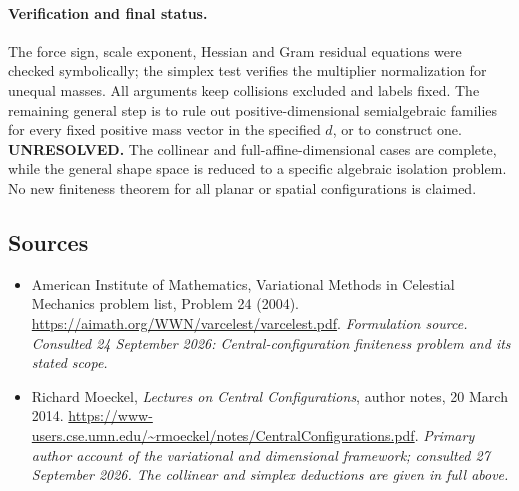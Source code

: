 \documentclass[11pt]{article}
\begin{document}
\paragraph{Verification and final status.}
The force sign, scale exponent, Hessian and Gram residual equations
were checked symbolically; the simplex test verifies the multiplier
normalization for unequal masses. All arguments keep collisions
excluded and labels fixed. The remaining general step is to rule
out positive-dimensional semialgebraic families for every fixed
positive mass vector in the specified $d$, or to construct one.
\textbf{UNRESOLVED.} The collinear and full-affine-dimensional cases
are complete, while the general shape space is reduced to a
specific algebraic isolation problem. No new finiteness theorem
for all planar or spatial configurations is claimed.

\subsection{Sources}
\begin{itemize}
\item[S1]American Institute of Mathematics, Variational Methods in Celestial Mechanics problem list, Problem 24 (2004).
\url{https://aimath.org/WWN/varcelest/varcelest.pdf}.
\textit{Formulation source. Consulted 24 September 2026: Central-configuration finiteness problem and its stated scope.}
\item[E1]Richard Moeckel, \emph{Lectures on Central Configurations}, author notes, 20 March 2014.
\url{https://www-users.cse.umn.edu/~rmoeckel/notes/CentralConfigurations.pdf}.
\textit{Primary author account of the variational and dimensional framework; consulted 27 September 2026. The collinear and simplex deductions are given in full above.}
\end{itemize}
\end{document}
